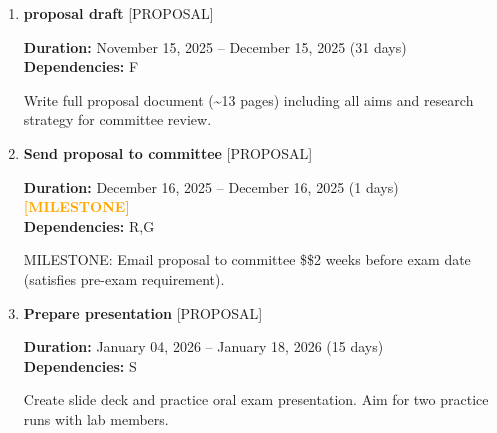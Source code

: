 \documentclass[landscape,a4paper]{article}
\begin{document}
\begin{enumerate}[leftmargin=1.5cm, itemsep=1em, parsep=0.5em]
    \item \textcolor{researchcore}{\textbf{\large proposal draft}}
          \hfill \textcolor{black!60}{\small [PROPOSAL]}
          
          \vspace{0.2em}
          \textcolor{black!70}{\textbf{Duration:} November 15, 2025 -- December 15, 2025 (31 days)}
          \\[0.2em]\textcolor{black!70}{\textbf{Dependencies:} F}\n
          \vspace{0.4em}
          \begin{minipage}[t]{0.9\textwidth}
          \textcolor{black!85}{Write full proposal document (\textasciitilde{}13 pages) including all aims and research strategy for committee review.}
          \end{minipage}

    \item \textcolor{researchcore}{\textbf{\large Send proposal to committee}}
          \hfill \textcolor{black!60}{\small [PROPOSAL]}
          
          \vspace{0.2em}
          \textcolor{black!70}{\textbf{Duration:} December 16, 2025 -- December 16, 2025 (1 days)}
          \textcolor{orange}{\textbf{ [MILESTONE]}}\n          \\[0.2em]\textcolor{black!70}{\textbf{Dependencies:} R,G}\n
          \vspace{0.4em}
          \begin{minipage}[t]{0.9\textwidth}
          \textcolor{black!85}{MILESTONE: Email proposal to committee \$\geq\$2 weeks before exam date (satisfies pre-exam requirement).}
          \end{minipage}

    \item \textcolor{researchcore}{\textbf{\large Prepare presentation}}
          \hfill \textcolor{black!60}{\small [PROPOSAL]}
          
          \vspace{0.2em}
          \textcolor{black!70}{\textbf{Duration:} January 04, 2026 -- January 18, 2026 (15 days)}
          \\[0.2em]\textcolor{black!70}{\textbf{Dependencies:} S}\n
          \vspace{0.4em}
          \begin{minipage}[t]{0.9\textwidth}
          \textcolor{black!85}{Create slide deck and practice oral exam presentation. Aim for two practice runs with lab members.}
          \end{minipage}


\end{enumerate}
\end{document}
